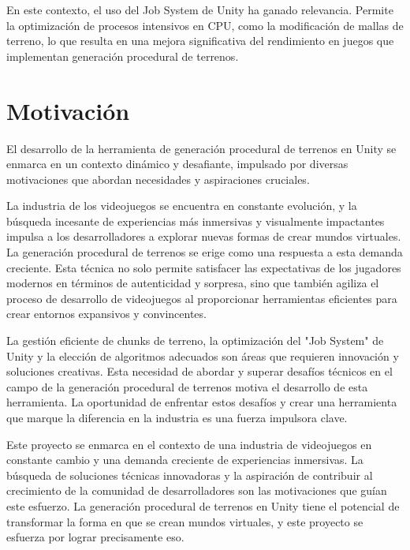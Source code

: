 En este contexto, el uso del Job System de Unity ha ganado relevancia. Permite la optimización de procesos intensivos en CPU, como la modificación de mallas de terreno, lo que resulta en una mejora significativa del rendimiento en juegos que implementan generación procedural de terrenos.

\section{Motivación}

El desarrollo de la herramienta de generación procedural de terrenos en Unity se enmarca en un contexto dinámico y desafiante, impulsado por diversas motivaciones que abordan necesidades y aspiraciones cruciales.

La industria de los videojuegos se encuentra en constante evolución, y la búsqueda incesante de experiencias más inmersivas y visualmente impactantes impulsa a los desarrolladores a explorar nuevas formas de crear mundos virtuales. La generación procedural de terrenos se erige como una respuesta a esta demanda creciente. Esta técnica no solo permite satisfacer las expectativas de los jugadores modernos en términos de autenticidad y sorpresa, sino que también agiliza el proceso de desarrollo de videojuegos al proporcionar herramientas eficientes para crear entornos expansivos y convincentes.

La gestión eficiente de chunks de terreno, la optimización del "Job System" de Unity y la elección de algoritmos adecuados son áreas que requieren innovación y soluciones creativas. Esta necesidad de abordar y superar desafíos técnicos en el campo de la generación procedural de terrenos motiva el desarrollo de esta herramienta. La oportunidad de enfrentar estos desafíos y crear una herramienta que marque la diferencia en la industria es una fuerza impulsora clave.

Este proyecto se enmarca en el contexto de una industria de videojuegos en constante cambio y una demanda creciente de experiencias inmersivas. La búsqueda de soluciones técnicas innovadoras y la aspiración de contribuir al crecimiento de la comunidad de desarrolladores son las motivaciones que guían este esfuerzo. La generación procedural de terrenos en Unity tiene el potencial de transformar la forma en que se crean mundos virtuales, y este proyecto se esfuerza por lograr precisamente eso.
\newpage
